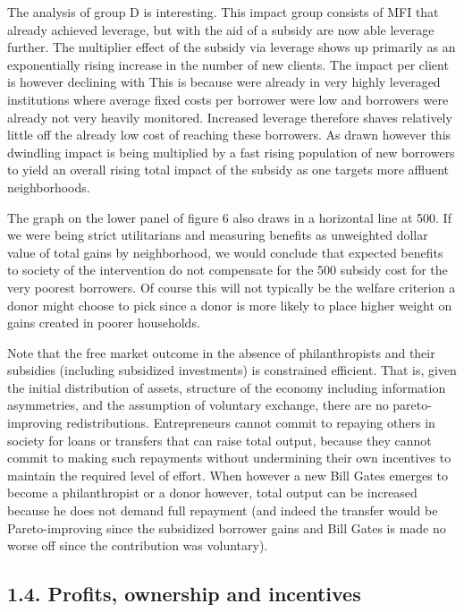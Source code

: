 \documentclass{article}
\begin{document}
The analysis of group D is interesting. This impact group consists of
MFI that already achieved leverage, but with the aid of a subsidy are
now able leverage further. The multiplier effect of the subsidy via
leverage shows up primarily as an exponentially rising increase in the
number of new clients. The impact per client is however declining with
This is because were already in very highly leveraged institutions where
average fixed costs per borrower were low and borrowers were already not
very heavily monitored. Increased leverage therefore shaves relatively
little off the already low cost of reaching these borrowers. As drawn
however this dwindling impact is being multiplied by a fast rising
population of new borrowers to yield an overall rising total impact of
the subsidy as one targets more affluent neighborhoods.

The graph on the lower panel of figure 6 also draws in a horizontal line
at 500. If we were being strict utilitarians and measuring benefits as
unweighted dollar value of total gains by neighborhood, we would
conclude that expected benefits to society of the intervention do not
compensate for the 500 subsidy cost for the very poorest borrowers. Of
course this will not typically be the welfare criterion a donor might
choose to pick since a donor is more likely to place higher weight on
gains created in poorer households.

Note that the free market outcome in the absence of philanthropists and
their subsidies (including subsidized investments) is constrained
efficient. That is, given the initial distribution of assets, structure
of the economy including information asymmetries, and the assumption of
voluntary exchange, there are no pareto-improving redistributions.
Entrepreneurs cannot commit to repaying others in society for loans or
transfers that can raise total output, because they cannot commit to
making such repayments without undermining their own incentives to
maintain the required level of effort. When however a new Bill Gates
emerges to become a philanthropist or a donor however, total output can
be increased because he does not demand full repayment (and indeed the
transfer would be Pareto-improving since the subsidized borrower gains
and Bill Gates is made no worse off since the contribution was
voluntary).

\subsection{1.4. Profits, ownership and incentives
}\label{profits-ownership-and-incentives}
\end{document}
